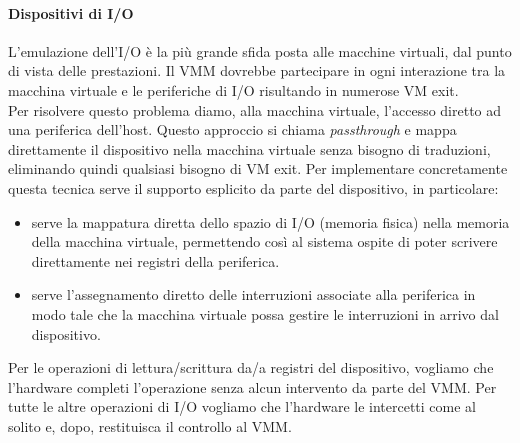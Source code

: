 \documentclass{article}
\begin{document}
\paragraph{Dispositivi di I/O}
L’emulazione dell’I/O è la più grande sfida posta alle macchine virtuali, dal punto di vista delle prestazioni. Il VMM dovrebbe partecipare in ogni interazione tra la macchina virtuale e le periferiche di I/O risultando in numerose VM exit.\\
Per risolvere questo problema diamo, alla macchina virtuale, l’accesso diretto ad una periferica dell’host. Questo approccio si chiama \textit{passthrough} e mappa direttamente il dispositivo nella macchina virtuale senza bisogno di traduzioni, eliminando quindi qualsiasi bisogno di VM exit. Per implementare concretamente questa tecnica serve il supporto esplicito da parte del dispositivo, in particolare:
\begin{itemize}
    \item serve la mappatura diretta dello spazio di I/O (memoria fisica) nella memoria della macchina virtuale, permettendo così al sistema ospite di poter scrivere direttamente nei registri della periferica.
    \item serve l’assegnamento diretto delle interruzioni associate alla periferica in modo tale che la macchina virtuale possa gestire le interruzioni in arrivo dal dispositivo.
\end{itemize}
Per le operazioni di lettura/scrittura da/a registri del dispositivo, vogliamo che l’hardware completi l’operazione senza alcun intervento da parte del VMM. Per tutte le altre operazioni di I/O vogliamo che l’hardware le intercetti come al solito e, dopo, restituisca il controllo al VMM.
\end{document}
